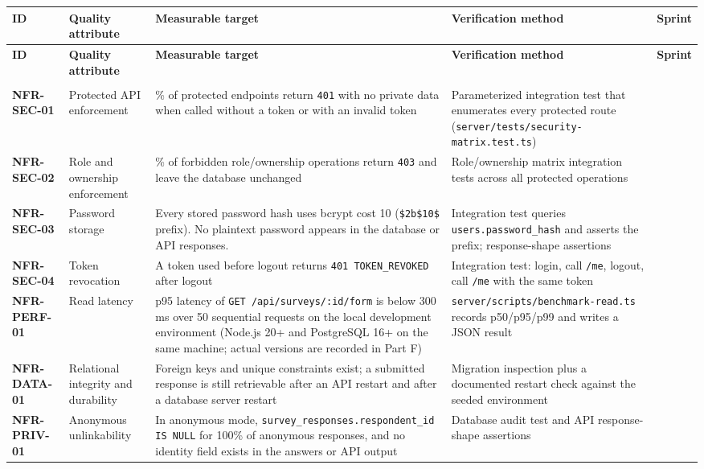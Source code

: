 \documentclass[12pt,a4paper]{article}
\begin{document}
{\setlength{\tabcolsep}{3pt}\renewcommand{\arraystretch}{1.08}\scriptsize
\begin{longtable}{@{}>{\raggedright\arraybackslash}p{}>{\raggedright\arraybackslash}p{}>{\raggedright\arraybackslash}p{}>{\raggedright\arraybackslash}p{}>{\raggedright\arraybackslash}p{}@{}}
\toprule
\textbf{ID} & \textbf{Quality attribute} & \textbf{Measurable target} & \textbf{Verification method} & \textbf{Sprint} \\
\midrule
\endfirsthead
\toprule
\textbf{ID} & \textbf{Quality attribute} & \textbf{Measurable target} & \textbf{Verification method} & \textbf{Sprint} \\
\midrule
\endhead
\midrule
\multicolumn{5}{r}{\footnotesize\textit{Continued on next page}}\\
\endfoot
\bottomrule
\endlastfoot
\textbf{NFR-SEC-01} & Protected API enforcement & 100\% of protected endpoints return \texttt{401} with no private data when called without a token or with an invalid token & Parameterized integration test that enumerates every protected route (\texttt{server/tests/security-matrix.test.ts}) & 1 \\
\textbf{NFR-SEC-02} & Role and ownership enforcement & 100\% of forbidden role/ownership operations return \texttt{403} and leave the database unchanged & Role/ownership matrix integration tests across all protected operations & 1 \\
\textbf{NFR-SEC-03} & Password storage & Every stored password hash uses bcrypt cost 10 (\texttt{\$2b\$10\$} prefix). No plaintext password appears in the database or API responses. & Integration test queries \texttt{users.password\_hash} and asserts the prefix; response-shape assertions & 1 \\
\textbf{NFR-SEC-04} & Token revocation & A token used before logout returns \texttt{401 TOKEN\_REVOKED} after logout & Integration test: login, call \texttt{/me}, logout, call \texttt{/me} with the same token & 1 \\
\textbf{NFR-PERF-01} & Read latency & p95 latency of \texttt{GET /api/surveys/:id/form} is below 300 ms over 50 sequential requests on the local development environment (Node.js 20+ and PostgreSQL 16+ on the same machine; actual versions are recorded in Part F) & \texttt{server/scripts/benchmark-read.ts} records p50/p95/p99 and writes a JSON result & 1 \\
\textbf{NFR-DATA-01} & Relational integrity and durability & Foreign keys and unique constraints exist; a submitted response is still retrievable after an API restart and after a database server restart & Migration inspection plus a documented restart check against the seeded environment & 1 \\
\textbf{NFR-PRIV-01} & Anonymous unlinkability & In anonymous mode, \texttt{survey\_responses.respondent\_id IS NULL} for 100\% of anonymous responses, and no identity field exists in the answers or API output & Database audit test and API response-shape assertions & 2 \\
\end{longtable}}
\end{document}
